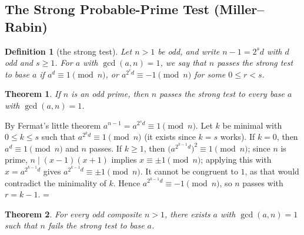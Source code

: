 \documentclass[11pt]{article}
\makeatletter
\theoremstyle{ntstyle}
\newtheorem{theorem}{Theorem}[subsection]
\newtheorem{definition}{Definition}[subsection]
\let\nt@closedisplay\]
\def\nt@guardedclose{\@ifnextchar\par{\nt@closeafterpar}{\@ifnextchar\end{\postdisplaypenalty\@M\nt@closedisplay}{\nt@closedisplay}}}
\def\nt@closeafterpar\par{\@ifnextchar\par{\nt@closeafterpar}{\@ifnextchar\end{\postdisplaypenalty\@M\nt@closedisplay\par}{\nt@closedisplay\par}}}
\renewenvironment{proof}[1][\proofname]{\par
  \pushQED{\qed}\normalfont\topsep\medskipamount\edef\nt@afterproof{\@endparpenalty=\the\@endparpenalty\relax}\@beginparpenalty\@M\@endparpenalty\@M\let\]\nt@guardedclose\trivlist\item[]\textit{#1\@addpunct{.}} \ignorespaces}{\ifvmode\addpenalty\@M\fi\popQED\nt@afterproof\endtrivlist\@endpefalse}
\makeatother
\begin{document}
\subsection{The Strong Probable-Prime Test (Miller--Rabin)}

\begin{definition}[the strong test]\label{def:9.4.1} Let
	$n>1$ be odd, and write $n-1=2^{s}d$ with $d$ odd and $s\ge1$. For $a$ with
	$\gcd(a, n)=1$, we say that $n$ passes the strong test to base $a$ if
	$a^{d}\equiv1\pmod{n}$, or $a^{2^{r}d}\equiv-1\pmod{n}$ for some $0\le r<s$.
\end{definition}
\begin{theorem}\label{thm:9.4.1} If $n$ is
	an odd prime, then $n$ passes the strong test to every base $a$ with
	$\gcd(a, n)=1$.
\end{theorem}

\begin{proof} By Fermat's little theorem
	$a^{n-1}=a^{2^{s}d}\equiv1\pmod{n}$. Let $k$ be minimal with $0\le
		k\le s$ such that $a^{2^{k}d}\equiv1\pmod{n}$ (it exists since $k=s$
	works). If $k=0$, then $a^{d}\equiv1\pmod{n}$ and $n$ passes. If
	$k\ge1$, then $\big(a^{2^{k-1}d}\big)^2\equiv1\pmod{n}$; since $n$ is
	prime, $n\mid(x-1)(x+1)$ implies $x\equiv\pm1\pmod{n}$; applying this
	with $x=a^{2^{k-1}d}$ gives
	$a^{2^{k-1}d}\equiv\pm1\pmod{n}$. It cannot be congruent to $1$, as that
	would contradict the minimality of $k$. Hence
	$a^{2^{k-1}d}\equiv-1\pmod{n}$, so $n$ passes with $r=k-1$.
\end{proof}
\begin{theorem}\label{thm:9.4.2} For every odd composite $n>1$, there exists $a$ with
	$\gcd(a, n)=1$ such that $n$ fails the strong test to base $a$.
\end{theorem}
\end{document}
